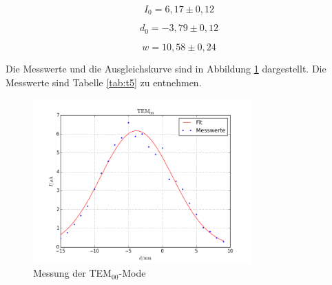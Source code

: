 \begin{equation*}
I_0=6,17\pm0,12
\end{equation*}

\begin{equation*}
d_0=-3,79\pm0,12
\end{equation*}

\begin{equation*}
w=10,58\pm0,24
\end{equation*}

\noindent Die Messwerte und die Ausgleichskurve sind in Abbildung \ref{fig:TEM00} dargestellt. Die Messwerte sind Tabelle \ref{tab:t5} zu entnehmen.

\begin{figure}
	\centering
	\includegraphics[width=0.75\textwidth]{plots/TEM00}
	\caption{Messung der TEM\(_{00}\)-Mode}
	\label{fig:TEM00}
\end{figure}

